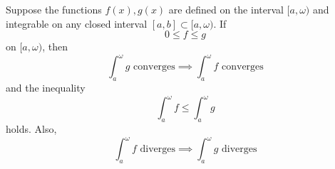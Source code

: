   \begin{theorem}
    \label{thm:comparison-test-for-convergence-of-improper}
    Suppose the functions $f(x), g(x)$ are defined on the interval $[a, \omega)$ and integrable on any closed interval $[a, b] \subset [a, \omega)$. If 
    \begin{equation}
      0 \leq f \leq g
    \end{equation}
    on $[a, \omega)$, then 
    \begin{equation}
      \int_a^\omega g \text{ converges} \implies \int_a^\omega f \text{ converges}
    \end{equation}
    and the inequality 
    \begin{equation}
      \int_a^\omega f \leq \int_a^\omega g
    \end{equation}
    holds. Also, 
    \begin{equation}
      \int_a^\omega f \text{ diverges} \implies \int_a^\omega g \text{ diverges}
    \end{equation}
  \end{theorem}

